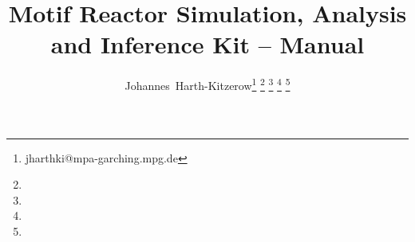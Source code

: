 \documentclass[10pt,a4paper]{book}
\author{Johannes~Harth-Kitzerow\setcounter{footnote}{0}\footnote{jharthki@mpa-garching.mpg.de}
    \footnote{\mpaadress}
    \footnote{\qbiotumadress}
    \footnote{\lmuadress}
    \footnote{\originsadress}
}
\begin{document}
\title{Motif Reactor Simulation, Analysis and Inference Kit -- Manual}

\maketitle



\medskip



\end{document}
